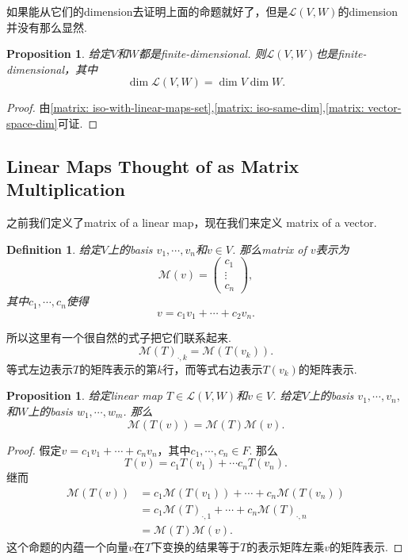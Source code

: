 \documentclass{article}
\newtheorem{proposition}[theorem]{Proposition}
\newtheorem{definition}[theorem]{Definition}
\begin{document}
{\color{red} 如果能从它们的dimension去证明上面的命题就好了，但是$\mathcal{L}(V,W)$的dimension并没有那么显然}.

\begin{proposition}\label{linear-map-space: dim}
\rm 给定$V$和$W$都是finite-dimensional. 则$\mathcal{L}(V,W)$也是finite-dimensional，其中
$$
\dim \mathcal{L}(V,W) = \dim V \dim W.
$$
\end{proposition}

\begin{proof}
由\ref{matrix: iso-with-linear-maps-set},\ref{matrix: iso-same-dim},\ref{matrix: vector-space-dim}可证.
\end{proof}

\newpage
\subsection{Linear Maps Thought of as Matrix Multiplication}

之前我们定义了{\color{blue}matrix of a linear map}，现在我们来定义{\color{blue} matrix of a vector}.

\begin{definition}
给定$V$上的basis $v_1,\cdots,v_n$和$v \in V$. 那么matrix of $v$表示为
$$
\mathcal{M}(v)=
\begin{pmatrix}
c_1 \\
\vdots\\
c_n
\end{pmatrix},
$$ 
其中$c_1,\cdots,c_n$使得
$$
v = c_1v_1 + \cdots + c_2v_n.
$$
\end{definition} 

{\color{blue} 所以这里有一个很自然的式子把它们联系起来}.
$$
\mathcal{M}(T)_{\cdot,k}=\mathcal{M}(T(v_k)).
$$
等式左边表示$T$的矩阵表示的第$k$行，而等式右边表示$T(v_k)$的矩阵表示.
\begin{proposition}\label{linear map: matrix-mul}
\rm 给定linear map $T \in \mathcal{L}(V,W)$和$v \in V$. 给定$V$上的basis $v_1,\cdots,v_n,$和$W$上的basis $w_1,\cdots,w_m$. 那么
$$
\mathcal{M}(T(v)) =  \mathcal{M}(T)\mathcal{M}(v).
$$
\end{proposition}

\begin{proof}
假定$v=c_1v_1 + \cdots + c_nv_n$，其中$c_1,\cdots,c_n \in F$. 那么
$$
T(v) =  c_1T(v_1) + \cdots c_nT(v_n).
$$
继而
$$
\begin{aligned}
\mathcal{M}(T(v)) &= c_1\mathcal{M}(T(v_1)) + \cdots +c_n \mathcal{M}(T(v_n)) \\
				&= c_1\mathcal{M}(T)_{\cdot,1} + \cdots + c_n \mathcal{M}(T)_{\cdot,n} \\
				&= \mathcal{M}(T)\mathcal{M}(v).
\end{aligned} 
$$
{\color{red}这个命题的内蕴一个向量$v$在$T$下变换的结果等于$T$的表示矩阵左乘$v$的矩阵表示}.
\end{proof}
\end{document}

